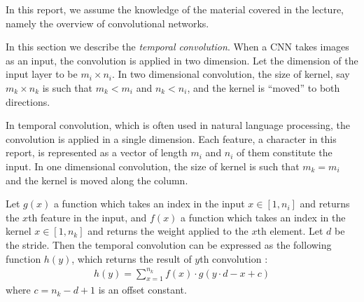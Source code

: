 In this report, we assume the knowledge of the material covered in the lecture, namely the overview of convolutional networks.

In this section we describe the \emph{temporal convolution}.
When a CNN takes images as an input, the convolution is applied in two dimension.
Let the dimension of the input layer to be $m_i \times n_i$.
In two dimensional convolution, the size of kernel, say $m_k \times n_k$ is such that $m_k < m_i$ and $n_k < n_i$, and the kernel is ``moved'' to both directions.

In temporal convolution, which is often used in natural language processing, the convolution is applied in a single dimension.
Each feature, a character in this report, is represented as a vector of length $m_i$ and $n_i$ of them constitute the input.
In one dimensional convolution, the size of kernel is such that $m_k = m_i$ and the kernel is moved along the column.

Let $g(x)$ a function which takes an index in the input $x \in [1, n_i]$ and returns the $x$th feature in the input, and $f(x)$ a function which takes an index in the kernel $x \in [1, n_k]$ and returns the weight applied to the $x$th element.
Let $d$ be the stride.
Then the temporal convolution can be expressed as the following function $h(y)$, which returns the result of $y$th convolution \citep{zhang2015character}:
\begin{align*}
h(y) = \sum_{x=1}^{n_k} f(x) \cdot g(y \cdot d - x + c)
\end{align*}
where $c = n_k - d + 1$ is an offset constant.
